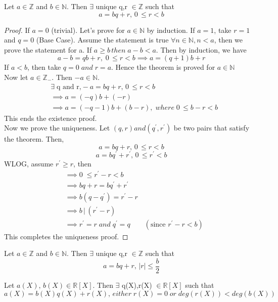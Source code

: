 \documentclass[10pt,a4paper]{article}
\begin{document}
\begin{theorem}
Let $a \in \mathbb{Z}$ and $b \in \mathbb{N}$. Then $\exists$ unique q,r $\in \mathbb{Z}$ such that $$a=bq+r,\, 0\,{\le}r<b$$
\end{theorem}

\begin{proof}
If $a=0$ (trivial). Let's prove for $a \in \mathbb{N}$ by induction. 
If $a = 1$, take $r = 1$ and $q = 0$ (Base Case).
Assume the statement is true $\forall n \in \mathbb{N}, n < a$, then we prove the statement for a. 
If $a \ge b\, then\; a-b<a$. 
Then by induction, we have $$a-b = qb+r, \; 0\, \le r <b \implies a = (q+1)b+r$$
If $a<b$, then take $q = 0 \;and\;r=a$. Hence the theorem is proved for $a\in \mathbb{N}$ \\
Now let $a\in \mathbb{Z}_{-}$. Then $-a\in\mathbb{N}$. 
\begin{align*}
&\exists\; \text{q and r,} -a = bq+r,\,  0\, \le r <b \\
&\implies a = (-q)b + (-r) \\
&\implies a = (-q-1)b + (b-r),\; where\;  0\, \le b- r <b
\end{align*}
This ends the existence proof.\\
Now we prove the uniqueness. Let $(q,r) and (q^{\prime},r^{\prime})$ be two pairs that satisfy the theorem. Then,
$$a=bq+r,\, 0\,{\le}r<b$$
$$a=bq^{\prime}+r^{\prime},\, 0\,{\le}r^{\prime}<b$$
WLOG, assume $r^{\prime}\ge r$, then
\begin{align*}
&\implies 0\;\le r^{\prime}-r<b \\
&\implies bq+r = bq^{\prime}+r^{\prime} \\
&\implies b(q-q^{\prime}) = r^{\prime}-r \\
&\implies b\,|\,(r^{\prime}-r) \\
&\implies r^{\prime}=r \;and\; q^{\prime}=q \qquad(\text{since }r^{\prime}-r<b)
\end{align*}
This completes the uniqueness proof.
\end{proof}

\begin{lemma}
Let $a \in \mathbb{Z}$ and $b \in \mathbb{N}$. Then $\exists$ unique q,r $\in \mathbb{Z}$ such that $$a=bq+r,\, \vert r\vert\le \frac{b}{2}$$
\end{lemma}

\begin{theorem}
Let $a(X),\,b(X) \in \mathbb{R}[X]$. Then $\exists$ q(X),r(X) $\in \mathbb{R}[X]$ such that $$a(X)=b(X)q(X)+r(X),\, either\; r(X) = 0 \;or\; deg(r(X))<deg(b(X))$$
\end{theorem}
\end{document}
